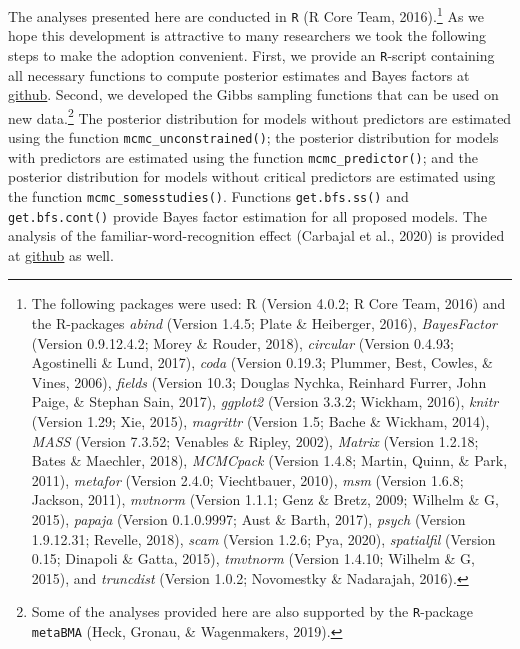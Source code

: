 \documentclass[english,,man]{apa6}
\begin{document}
The analyses presented here are conducted in \texttt{R} (R Core Team, 2016).\footnote{The following packages were used: R (Version 4.0.2; R Core Team, 2016) and the R-packages \emph{abind} (Version 1.4.5; Plate \& Heiberger, 2016), \emph{BayesFactor} (Version 0.9.12.4.2; Morey \& Rouder, 2018), \emph{circular} (Version 0.4.93; Agostinelli \& Lund, 2017), \emph{coda} (Version 0.19.3; Plummer, Best, Cowles, \& Vines, 2006), \emph{fields} (Version 10.3; Douglas Nychka, Reinhard Furrer, John Paige, \& Stephan Sain, 2017), \emph{ggplot2} (Version 3.3.2; Wickham, 2016), \emph{knitr} (Version 1.29; Xie, 2015), \emph{magrittr} (Version 1.5; Bache \& Wickham, 2014), \emph{MASS} (Version 7.3.52; Venables \& Ripley, 2002), \emph{Matrix} (Version 1.2.18; Bates \& Maechler, 2018), \emph{MCMCpack} (Version 1.4.8; Martin, Quinn, \& Park, 2011), \emph{metafor} (Version 2.4.0; Viechtbauer, 2010), \emph{msm} (Version 1.6.8; Jackson, 2011), \emph{mvtnorm} (Version 1.1.1; Genz \& Bretz, 2009; Wilhelm \& G, 2015), \emph{papaja} (Version 0.1.0.9997; Aust \& Barth, 2017), \emph{psych} (Version 1.9.12.31; Revelle, 2018), \emph{scam} (Version 1.2.6; Pya, 2020), \emph{spatialfil} (Version 0.15; Dinapoli \& Gatta, 2015), \emph{tmvtnorm} (Version 1.4.10; Wilhelm \& G, 2015), and \emph{truncdist} (Version 1.0.2; Novomestky \& Nadarajah, 2016).} As we hope this development is attractive to many researchers we took the following steps to make the adoption convenient. First, we provide an \texttt{R}-script containing all necessary functions to compute posterior estimates and Bayes factors at \href{https://github.com/jstbcs/meta-poor/blob/public/share/lib.R}{github}. Second, we developed the Gibbs sampling functions that can be used on new data.\footnote{Some of the analyses provided here are also supported by the \texttt{R}-package \texttt{metaBMA} (Heck, Gronau, \& Wagenmakers, 2019).} The posterior distribution for models without predictors are estimated using the function \texttt{mcmc\_unconstrained()}; the posterior distribution for models with predictors are estimated using the function \texttt{mcmc\_predictor()}; and the posterior distribution for models without critical predictors are estimated using the function \texttt{mcmc\_somesstudies()}. Functions \texttt{get.bfs.ss()} and \texttt{get.bfs.cont()} provide Bayes factor estimation for all proposed models. The analysis of the familiar-word-recognition effect (Carbajal et al., 2020) is provided at \href{https://github.com/jstbcs/meta-poor/blob/public/papers/submission/analysis/analysis_carbajal.Rmd}{github} as well.
\end{document}
